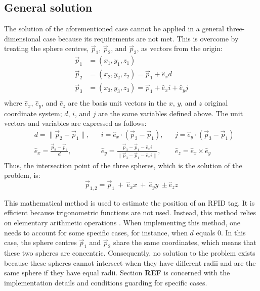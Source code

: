 \subsection{General solution}

The solution of the aforementioned case cannot be applied in a general three-dimensional case because its requirements are not met. This is overcome by treating the sphere centres, $\vec p_1$, $\vec p_2$, and $\vec p_3$, as vectors from the origin:
\begin{align*}
	\vec p_1 &= (x_1, y_1, z_1) \\
	\vec p_2 &= (x_2, y_2, z_2) = \vec p_1 + \hat e_x d \\
	\vec p_3 &= (x_3, y_3, z_3) = \vec p_1 + \hat e_x i + \hat e_y j \\
\end{align*}
where $\hat e_x$, $\hat e_y$, and $\hat e_z$ are the basis unit vectors in the $x$, $y$, and $z$ original coordinate system; $d$, $i$, and $j$ are the same variables defined above. The unit vectors and variables are expressed as follows:
\begin{align*}
	& d = \| \vec p_2 - \vec p_1 \|, &&  i = \hat e_x \cdot ( \vec p_3 - \vec p_1 ), && j = \hat e_y \cdot ( \vec p_3 - \vec p_1 ) \\
	& \hat e_x = \frac{ \vec p_2 - \vec p_1 }{ d }, && \hat e_y = \frac{ \vec p_3 - \vec p_1 - \hat e_x i}{ \| \vec p_3 - \vec p_1 - \hat e_x i \| }, && \hat e_z = \hat e_x \times \hat e_y
\end{align*}
Thus, the intersection point of the three spheres, which is the solution of the problem, is:
\[\vec p_{1,2} = \vec p_1 \ + \ \hat e_x x \ + \ \hat e_y y \ \pm \hat e_z z\]

This mathematical method is used to estimate the position of an RFID tag. It is efficient because trigonometric functions are not used. Instead, this method relies on elementary arithmetic operations \cite{Manolakis1996}. When implementing this method, one needs to account for some specific cases, for instance, when $d$ equals $0$. In this case, the sphere centres $\vec p_1$ and $\vec p_2$ share the same coordinates, which means that these two spheres are concentric. Consequently, no solution to the problem exists because these spheres cannot intersect when they have different radii and are the same sphere if they have equal radii. Section \textbf{REF} is concerned with the implementation details and conditions guarding for specific cases. 
